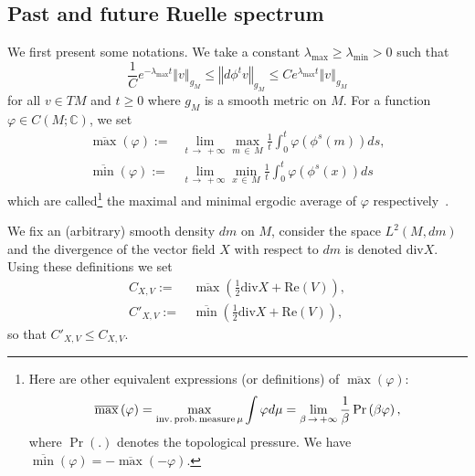 \documentclass[AHL,Unicode,longabstracts,published]{cedram}
\newcommand{\Ree}{\mathrm{Re}}
\newcommand{\divv}{\mathrm{div}}
\newcommand{\bbC}{\mathbb{C}}
\newcommand{\Ree}{\mathrm{Re}}
\begin{document}
\subsection{Past and future Ruelle spectrum}

We first present some notations. We take a constant $\lambda_{\max}\geq\lambda_{\min}>0$ such that
\begin{equation}\label{eq:l_max}
\frac{1}{C}e^{-\lambda_{\max}t}\left\Vert v\right\Vert _{g_{M}}\le\left\Vert d\phi^{t}v\right\Vert _{g_{M}}\leq Ce^{\lambda_{\max}t}\left\Vert v\right\Vert _{g_{M}}
\end{equation}
for all $v\in TM$ and $t\ge0$ where $g_{M}$ is a smooth metric on $M$. For a function $\varphi\in C(M;\bbC)$, we set
\begin{align}
\overline{\max}\left(\varphi\right):=& \lim_{t\, \rightarrow\,+\infty}\max_{m\,\in\,M}\frac{1}{t}\int_{0}^{t}\varphi\left(\phi^{s}\left(m\right)\right)ds,\label{eq:def_tmax}
\\
\overline{\min}\left(\varphi\right):=& \lim_{t\,\rightarrow\,+\infty}\min_{x\,\in\,M}\frac{1}{t}\int_{0}^{t}\varphi\left(\phi^{s}\left(x\right)\right)ds\label{eq:def_tmin}
\end{align}
which are called\footnote{Here are other equivalent expressions (or definitions) of $\overline{\max}(\varphi)$:
\[
\overline{\max}\left(\varphi\right)=\max_{\text{inv.\,prob.\,measure\,}\mu}\int\varphi d\mu=\lim_{\beta\,\rightarrow\,+\infty}\frac{1}{\beta}\Pr\left(\beta\varphi\right),
\]
where $\Pr(.)$ denotes the topological pressure. We have $\overline{\min}(\varphi)=-\overline{\max}(-\varphi)$.} the maximal and minimal ergodic average of $\varphi$ respectively~\cite{jenkinson_2018}.

We fix an (arbitrary) smooth density $dm$ on $M$, consider the space $L^{2}(M,dm)$ and the divergence of the vector field $X$ with respect to $dm$ is denoted $\divv X$. Using these definitions we set
\begin{align}
C_{X,V}:=&\,\overline{\max}\left(\frac{1}{2}\divv X+\Ree\left(V\right)\right),\label{eq:C_XV}
\\
C'_{X,V}:=&\, \overline{\min}\left(\frac{1}{2}\divv X+\Ree\left(V\right)\right),\label{eq:C_XV-1}
\end{align}
so that $C'_{X,V}\leq C_{X,V}$.
\end{document}

